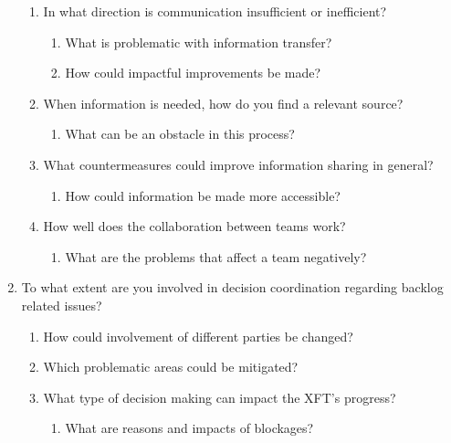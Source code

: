 \begin{enumerate}
\begin{enumerate}
      \item In what direction is communication insufficient or inefficient?
      
        \begin{enumerate}
          \item What is problematic with information transfer?
          \item How could impactful improvements be made?
        \end{enumerate}
      
      \item When information is needed, how do you find a relevant source?
      
        \begin{enumerate}
          \item What can be an obstacle in this process?
        \end{enumerate}
      
      \item What countermeasures could improve information sharing in general?
      
        \begin{enumerate}
          \item How could information be made more accessible?
        \end{enumerate}
      
      \item How well does the collaboration between teams work?
      
        \begin{enumerate}
          \item What are the problems that affect a team negatively?
        \end{enumerate}
     \end{enumerate}
  
  \item To what extent are you involved in decision coordination regarding backlog related issues?
  
  \begin{enumerate}
     \item How could involvement of different parties be changed?
     \item Which problematic areas could be mitigated?
     \item What type of decision making can impact the XFT’s progress?
    
      \begin{enumerate}
       \item What are reasons and impacts of blockages?
       \end{enumerate}
  \end{enumerate}
  

\end{enumerate}

